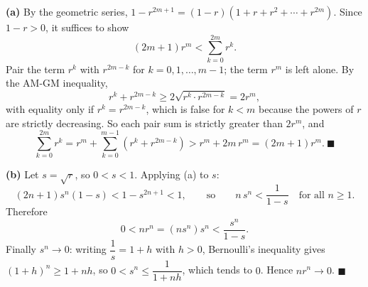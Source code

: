 \textbf{(a)} By the geometric series, $1-r^{2m+1}=(1-r)\left(1+r+r^2+\cdots+r^{2m}\right)$. Since $1-r>0$, it suffices to show
\[(2m+1)r^m<\sum_{k=0}^{2m}r^k.\]
Pair the term $r^k$ with $r^{2m-k}$ for $k=0,1,\dots,m-1$; the term $r^m$ is left alone. By the AM-GM inequality,
\[r^k+r^{2m-k}\ge2\sqrt{r^k\cdot r^{2m-k}}=2r^m,\]
with equality only if $r^k=r^{2m-k}$, which is false for $k<m$ because the powers of $r$ are strictly decreasing. So each pair sum is strictly greater than $2r^m$, and
\[\sum_{k=0}^{2m}r^k=r^m+\sum_{k=0}^{m-1}\left(r^k+r^{2m-k}\right)>r^m+2m\,r^m=(2m+1)r^m.\ \blacksquare\]

\textbf{(b)} Let $s=\sqrt r$, so $0<s<1$. Applying (a) to $s$:
\[(2n+1)s^n(1-s)<1-s^{2n+1}<1,\qquad\text{so}\qquad n\,s^n<\dfrac{1}{1-s}\quad\text{for all }n\ge1.\]
Therefore
\[0<nr^n=\left(ns^n\right)s^n<\dfrac{s^n}{1-s}.\]
Finally $s^n\to0$: writing $\dfrac1s=1+h$ with $h>0$, Bernoulli's inequality gives $(1+h)^n\ge1+nh$, so $0<s^n\le\dfrac{1}{1+nh}$, which tends to $0$. Hence $nr^n\to0$. $\blacksquare$
